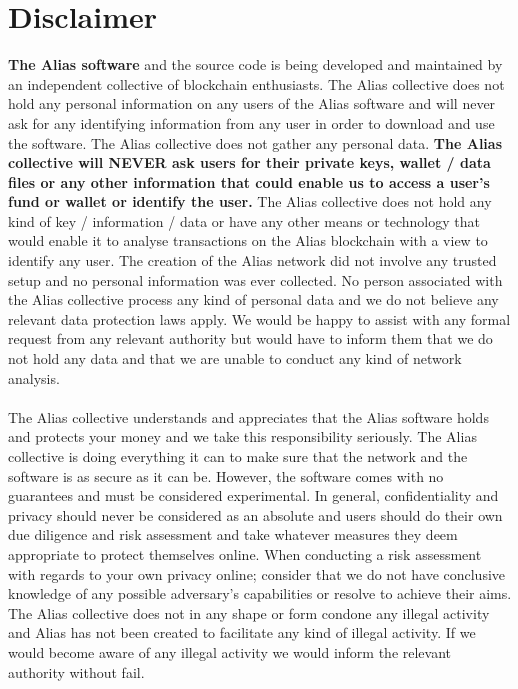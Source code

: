 \section{Disclaimer}
\textbf{The Alias software} and the source code is being developed 
and maintained by an independent collective of blockchain enthusiasts.
The Alias collective does not hold any personal information on any users of the
Alias software and will never ask for any identifying information
from any user in order to download and use the software. The Alias collective
does not gather any personal data. \textbf{The Alias collective will NEVER ask
users for their private keys, wallet / data files or any other information 
that could enable us to access a user’s fund or wallet or identify the
user.} The Alias collective does not hold any kind of key / information / data
or have any other means or technology that would enable it to analyse
transactions on the Alias blockchain with a view to identify any
user. The creation of the Alias network did not involve any trusted
setup and no personal information was ever collected. No person associated with the Alias collective process any kind of personal data and we do not believe any relevant data protection laws apply. We would be happy to assist with any formal request from any relevant authority but would have to inform them that we do not hold any data and that we are unable to conduct any kind of network analysis.
\\
\\
The Alias collective understands and appreciates that the Alias software 
holds and protects your money and we take this responsibility seriously. The Alias collective is doing everything it can to make sure that the network and
the software is as secure as it can be. However, the software comes with
no guarantees and must be considered experimental. In general, confidentiality
and privacy should never be considered as an absolute and users should do their
own due diligence and risk assessment and take whatever measures they deem
appropriate to protect themselves online. When conducting a risk assessment
with regards to your own privacy online; consider that we do not have
conclusive knowledge of any possible adversary’s capabilities or resolve to
achieve their aims. The Alias collective does not in any shape or form condone any illegal activity and Alias has not been created to facilitate any kind
of illegal activity. If we would become aware of any illegal activity we would inform the relevant authority without fail.
\\
